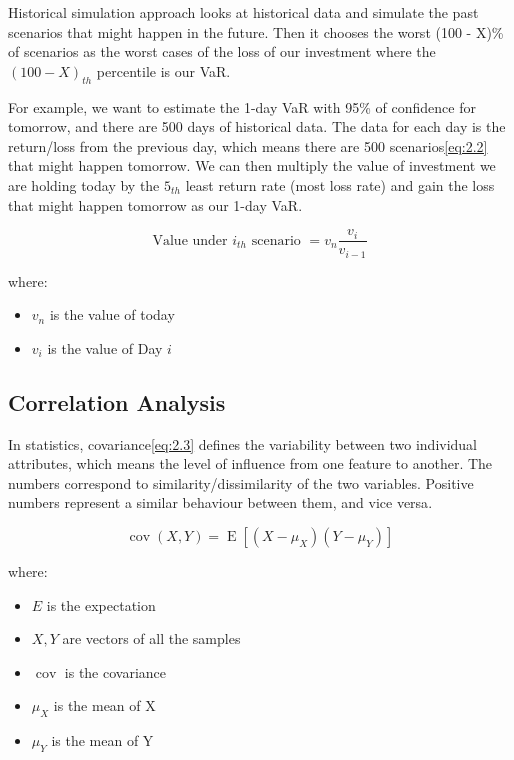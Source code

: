 \documentclass[11pt]{article} %
\theoremstyle{plain}
\theoremstyle{definition}
\begin{document}
Historical simulation approach looks at historical data and simulate the past  scenarios that might happen in the future. Then it chooses the worst (100 - X)\% of scenarios as the worst cases of the loss of our investment where the $(100 - X)_{th}$ percentile is our VaR.

For example, we want to estimate the 1-day VaR with 95\% of confidence for tomorrow, and there are 500 days of historical data. The data for each day is the return/loss from the previous day, which means there are 500 scenarios\eqref{eq:2.2} that might happen tomorrow. We can then multiply the value of investment we are holding today by the $5_{th}$ least return rate (most loss rate) and gain the loss that might happen tomorrow as our 1-day VaR\cite{john/ofaod:2017}.

{
  \begin{equation}
    \label{eq:2.2}
    \tag{2.2}
    {\text{Value under } i_{th} \text{ scenario } = v_{n}\frac{v_{i}}{v_{i-1}}}
  \end{equation}

  \footnotesize
  where:
  \begin{itemize}[label=-, leftmargin=4em, itemsep=0.1em]
    \item $v_{n}$ is the value of today
    \item $v_{i}$ is the value of Day $i$
  \end{itemize}
}

\subsection{Correlation Analysis}

In statistics, covariance\eqref{eq:2.3} defines the variability between two individual attributes, which means the level of influence from one feature to another. The numbers correspond to similarity/dissimilarity of the two variables. Positive numbers represent a similar behaviour between them, and vice versa\cite{wiki/cov:2018}.

{
  \begin{equation}
    \label{eq:2.3}
    \tag{2.3}
    {\operatorname {cov} (X,Y)=\operatorname {E} [(X-\mu _{X})(Y-\mu _{Y})]}
  \end{equation}

  \footnotesize
  where:
  \begin{itemize}[label=-, leftmargin=4em, itemsep=0.1em]
    \item ${E}$ is the expectation
    \item ${X, Y}$ are vectors of all the samples
    \item $\operatorname {cov}$ is the covariance
    \item ${\mu}_{X}$ is the mean of X
    \item ${\mu}_{Y}$ is the mean of Y
  \end{itemize}
}
\end{document}
